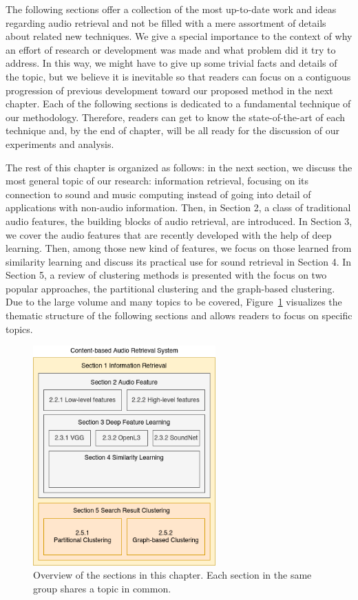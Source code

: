 The following sections offer a collection of the most up-to-date work and ideas regarding audio retrieval and not be filled with a mere assortment of details about related new techniques. We give a special importance to the context of why an effort of research or development was made and what problem did it try to address. In this way, we might have to give up some trivial facts and details of the topic, but we believe it is inevitable so that readers can focus on a contiguous progression of previous development toward our proposed method in the next chapter. Each of the following sections is dedicated to a fundamental technique of our methodology. Therefore, readers can get to know the state-of-the-art of each technique and, by the end of chapter, will be all ready for the discussion of our experiments and analysis.


The rest of this chapter is organized as follows: in the next section, we discuss the most general topic of our research: information retrieval, focusing on its connection to sound and music computing instead of going into detail of applications with non-audio information. Then, in Section 2, a class of traditional audio features, the building blocks of audio retrieval, are introduced. In Section 3, we cover the audio features that are recently developed with the help of deep learning. Then, among those new kind of features, we focus on those learned from similarity learning and discuss its practical use for sound retrieval in Section 4. In Section 5, a review of clustering methods is presented with the focus on two popular approaches, the partitional clustering and the graph-based clustering. Due to the large volume and many topics to be covered, Figure~\ref{toc-figrue} visualizes the thematic structure of the following sections and allows readers to focus on specific topics.

\begin{figure}[htb]
	\centering
	\includegraphics[width=7cm]{Figures/conceptual_relationship_of_sections.png}
	\caption{Overview of the sections in this chapter. Each section in the same group shares a topic in common.}
	\label{toc-figrue}
\end{figure}

